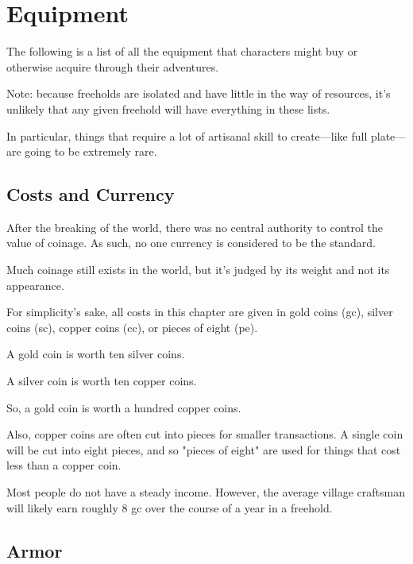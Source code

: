 \chapter{Equipment}

\begin{multicols}{2}

The following is a list of all the equipment that
characters might buy or otherwise acquire through
their adventures.

Note: because freeholds are isolated and have little
in the way of resources, it's unlikely that any given
freehold will have everything in these lists.

In particular, things that require a lot of artisanal
skill to create—like full plate—are going to be
extremely rare.

\section{Costs and Currency}

After the breaking of the world, there was no central
authority to control the value of coinage. As such, no
one currency is considered to be the standard.

Much coinage still exists in the world, but it's judged
by its weight and not its appearance.

For simplicity's sake, all costs in this chapter are
given in gold coins (gc), silver coins (sc), copper
coins (cc), or pieces of eight (pe).

A gold coin is worth ten silver coins.

A silver coin is worth ten copper coins.

So, a gold coin is worth a hundred copper coins.

Also, copper coins are often cut into pieces for smaller
transactions. A single coin will be cut into eight pieces,
and so "pieces of eight" are used for things that cost
less than a copper coin.

Most people do not have a steady income. However, the
average village craftsman will likely earn roughly
8 gc over the course of a year in a freehold.

\end{multicols}

\section{Armor}

